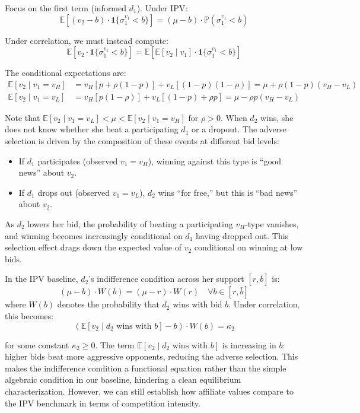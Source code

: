 \noindent Focus on the first term (informed $d_1$). Under IPV:
\[
\mathbb{E}\left[ (v_2 - b) \cdot \mathbf{1}\{\sigma_1^{v_1} < b\} \right] = (\mu - b) \cdot \mathbb{P}(\sigma_1^{v_1} < b)
\]

\noindent Under correlation, we must instead compute:
\[
\mathbb{E}\left[ v_2 \cdot \mathbf{1}\{\sigma_1^{v_1} < b\} \right] = \mathbb{E}\left[ \mathbb{E}[v_2 \mid v_1] \cdot \mathbf{1}\{\sigma_1^{v_1} < b\} \right]
\]

\noindent The conditional expectations are:
\begin{align*}
    \mathbb{E}[v_2 \mid v_1 = v_H] &= v_H [p + \rho(1-p)] + v_L [(1-p)(1-\rho)] = \mu + \rho(1-p)(v_H - v_L) \\
    \mathbb{E}[v_2 \mid v_1 = v_L] &= v_H [p(1-\rho)] + v_L [(1-p) + \rho p] = \mu - \rho p (v_H - v_L)
\end{align*}

\noindent Note that $\mathbb{E}[v_2 \mid v_1 = v_L] < \mu < \mathbb{E}[v_2 \mid v_1 = v_H]$ for $\rho > 0$. When $d_2$ wins, she does not know whether she beat a participating $d_1$ or a dropout. The adverse selection is driven by the composition of these events at different bid levels:
\begin{itemize}
    \item If $d_1$ participates (observed $v_1 = v_H$), winning against this type is ``good news'' about $v_2$.
    \item If $d_1$ drops out (observed $v_1 = v_L$), $d_2$ wins ``for free,'' but this is ``bad news'' about $v_2$.
\end{itemize}
As $d_2$ lowers her bid, the probability of beating a participating $v_H$-type vanishes, and winning becomes increasingly conditional on $d_1$ having dropped out. This selection effect drags down the expected value of $v_2$ conditional on winning at low bids.

\noindent In the IPV baseline, $d_2$'s indifference condition across her support $[r, \bar{b}]$ is:
\[
(\mu - b) \cdot W(b) = (\mu - r) \cdot W(r) \quad \forall b \in [r, \bar{b}]
\]
where $W(b)$ denotes the probability that $d_2$ wins with bid $b$. Under correlation, this becomes:
\[
\left( \mathbb{E}[v_2 \mid d_2 \text{ wins with } b] - b \right) \cdot W(b) = \kappa_2
\]

\noindent for some constant $\kappa_2 \geq 0$. The term $\mathbb{E}[v_2 \mid d_2 \text{ wins with } b]$ is increasing in $b$: higher bids beat more aggressive opponents, reducing the adverse selection. This makes the indifference condition a functional equation rather than the simple algebraic condition in our baseline, hindering a clean equilibrium characterization. However, we can still establish how affiliate values compare to the IPV benchmark in terms of competition intensity.

